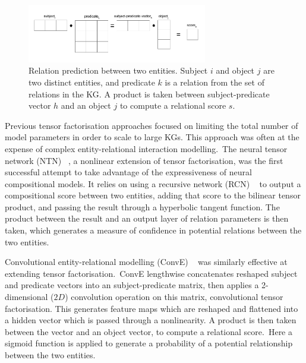 \begin{figure}[H]
   	\centering
    	\includegraphics[width=0.7\textwidth, height=0.3\textwidth]{inference}
	\captionsetup{justification=centering}
	\caption{Relation prediction between two entities. Subject $ i $ and object $ j $ are two distinct entities, and predicate $ k $ is a relation from the set of relations in the KG. A product is taken between subject-predicate vector $ h $ and an object $ j $ to compute a relational score $ s $.}
\end{figure}

\noindent Previous tensor factorisation approaches focused on limiting the total number of model parameters in order to scale to large KGs. This approach was often at the expense of complex entity-relational interaction modelling.\ The neural tensor network (NTN) \unskip~\citep{socher2013reasoning}, a nonlinear extension of tensor factorisation, was the first successful attempt to take advantage of the expressiveness of neural compositional models. It relies on using a recursive network (RCN) \unskip ~\citep{pollack1990recursive} to output a compositional score between two entities, adding that score to the bilinear tensor product, and passing the result through a hyperbolic tangent function. The product between the result and an output layer of relation parameters is then taken, which generates a measure of confidence in potential relations between the two entities.\par

\noindent Convolutional entity-relational modelling (ConvE) \unskip~\citep{dettmers2018convolutional} was similarly effective at extending tensor factorisation.\ ConvE lengthwise concatenates reshaped subject and predicate vectors into an subject-predicate matrix, then applies a 2-dimensional ($ 2D $) convolution operation on this matrix, convolutional tensor factorisation. This generates feature maps which are reshaped and flattened into a hidden vector which is passed through a nonlinearity. A product is then taken between the vector and an object vector, to compute a relational score.\ Here a sigmoid function is applied to generate a probability of a potential relationship between the two entities. \par 


